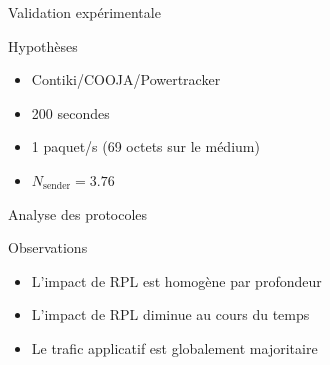 \begin{frame}{Validation expérimentale}
  \begin{block}{Hypothèses}
    \begin{itemize}
      \item Contiki/COOJA/Powertracker
      \item 200 secondes
      \item 1 paquet/s (69 octets sur le médium)
      \item $N_{\textrm{sender}} = 3.76$
    \end{itemize}
  \end{block}
  \begin{figure}
    \centering
    
  \end{figure}
\end{frame}

\begin{frame}{Analyse des protocoles}
    \begin{figure}
    \centering
    \end{figure}
    \begin{block}{Observations}
      \begin{itemize}
        \item L'impact de RPL est homogène par profondeur
        \item L'impact de RPL diminue au cours du temps
        \item Le trafic applicatif est globalement majoritaire
      \end{itemize}
    \end{block}
\end{frame}

